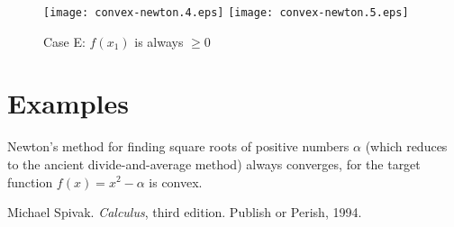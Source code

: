 \documentclass[12pt]{article}
\begin{document}
\begin{figure}[!htb]
\begin{center}
\texttt{[image: convex-newton.4.eps]}
\texttt{[image: convex-newton.5.eps]}
\end{center}
\caption{Case E: $f(x_1)$ is always $\geq 0$}
\end{figure}

\section*{Examples}

Newton's method for finding square roots of positive numbers $\alpha$
(which reduces to the ancient divide-and-average method) always
converges, for the target function $f(x) = x^2 - \alpha$ is convex.

\begin{thebibliography}{3}
Michael Spivak. {\it Calculus}, third edition. Publish or Perish, 1994.
\end{thebibliography}
\end{document}
